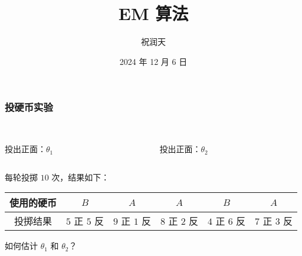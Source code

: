\documentclass{beamer}
\title{EM 算法}
\author{祝润天}
\institute{复旦大学计算机科学技术学院}
\date{2024 年 12 月 6 日}
\newcommand{\Gh}{\theta}
\begin{document}
\begin{frame}
    
    \maketitle

\end{frame}

\begin{frame}
    \frametitle{投硬币实验}

    \begin{columns}
        \begin{column}{0.5\textwidth}
            \centering
            \\投出正面：$\Gh_1$
        \end{column}
        \begin{column}{0.5\textwidth}
            \centering
            \\投出正面：$\Gh_2$
        \end{column}
    \end{columns}
    
    \pause

    \bigskip

    每轮投掷 $10$ 次，结果如下：

    \begin{table}
        \begin{tabular}{c|c|c|c|c|c}
            使用的硬币 & $B$ & $A$ & $A$ & $B$ & $A$ \\\hline
            投掷结果 & $5$ 正 $5$ 反 & $9$ 正 $1$ 反 & $8$ 正 $2$ 反 & $4$ 正 $6$ 反 & $7$ 正 $3$ 反
        \end{tabular}
    \end{table}

    \bigskip

    如何估计 $\Gh_1$ 和 $\Gh_2$？

\end{frame}
\end{document}
